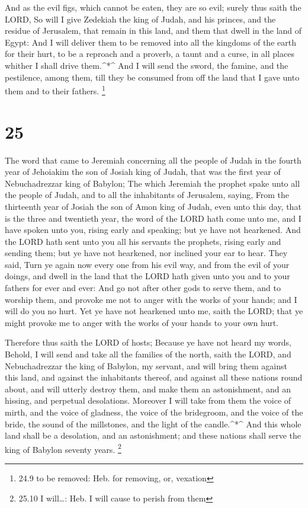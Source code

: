  And as the evil figs, which cannot be eaten, they are so
evil; surely thus saith the LORD, So will I give Zedekiah the king of
Judah, and his princes, and the residue of Jerusalem, that remain in
this land, and them that dwell in the land of Egypt:  And I
will deliver them to be removed into all the kingdoms of the earth for
their hurt, to be a reproach and a proverb, a taunt and a curse, in all
places whither I shall drive them.\^{}*\^{}  And I will
send the sword, the famine, and the pestilence, among them, till they be
consumed from off the land that I gave unto them and to their fathers.
\footnote{24.9 to be removed: Heb. for removing, or, vexation}

\hypertarget{section-24}{%
\section{25}\label{section-24}}

 The word that came to Jeremiah concerning all the people of
Judah in the fourth year of Jehoiakim the son of Josiah king of Judah,
that was the first year of Nebuchadrezzar king of Babylon; 
The which Jeremiah the prophet spake unto all the people of Judah, and
to all the inhabitants of Jerusalem, saying,  From the
thirteenth year of Josiah the son of Amon king of Judah, even unto this
day, that is the three and twentieth year, the word of the LORD hath
come unto me, and I have spoken unto you, rising early and speaking; but
ye have not hearkened.  And the LORD hath sent unto you all
his servants the prophets, rising early and sending them; but ye have
not hearkened, nor inclined your ear to hear.  They said,
Turn ye again now every one from his evil way, and from the evil of your
doings, and dwell in the land that the LORD hath given unto you and to
your fathers for ever and ever:  And go not after other gods
to serve them, and to worship them, and provoke me not to anger with the
works of your hands; and I will do you no hurt.  Yet ye have
not hearkened unto me, saith the LORD; that ye might provoke me to anger
with the works of your hands to your own hurt.

 Therefore thus saith the LORD of hosts; Because ye have not
heard my words,  Behold, I will send and take all the
families of the north, saith the LORD, and Nebuchadrezzar the king of
Babylon, my servant, and will bring them against this land, and against
the inhabitants thereof, and against all these nations round about, and
will utterly destroy them, and make them an astonishment, and an
hissing, and perpetual desolations.  Moreover I will take
from them the voice of mirth, and the voice of gladness, the voice of
the bridegroom, and the voice of the bride, the sound of the millstones,
and the light of the candle.\^{}*\^{}  And this whole land
shall be a desolation, and an astonishment; and these nations shall
serve the king of Babylon seventy years. \footnote{25.10 I will\ldots:
  Heb. I will cause to perish from them}

